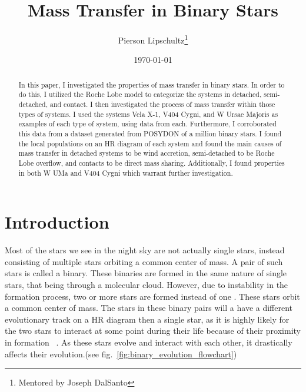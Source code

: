 \documentclass[12pt, a4paper]{article}
\title{Mass Transfer in Binary Stars}
\author{Pierson Lipschultz\thanks{Mentored by Joseph DalSanto}}
\date{\today}
\begin{document}
\maketitle
\begin{abstract}
    \normalsize
    In this paper, I investigated the properties of mass transfer in binary stars. In order to do this, I utilized the Roche Lobe model to categorize the systems in detached, semi-detached, and contact. I then investigated the process of mass transfer within those types of systems. I used the systems Vela X-1, V404 Cygni, and W Ursae Majoris as examples of each type of system, using data from each. Furthermore, I corroborated this data from a dataset generated from POSYDON of a million binary stars. I found the local populations on an HR diagram of each system and found the main causes of mass transfer in detached systems to be wind accretion, semi-detached to be Roche Lobe overflow, and contacts to be direct mass sharing. Additionally, I found properties in both W UMa and V404 Cygni which warrant further investigation.

\end{abstract}

\section{\centering Introduction} %

    Most of the stars we see in the night sky are not actually single stars, instead consisting of multiple stars orbiting a common center of mass. A pair of such stars is called a binary. These binaries are formed in the same nature of single stars, that being through a molecular cloud. However, due to instability in the formation process, two or more stars are formed instead of one \parencite{Offner_2016}. These stars orbit a common center of mass. The stars in these binary pairs will a have a different evolutionary track on a HR diagram then a single star, as it is highly likely for the two stars to interact at some point during their life because of their proximity in formation ~\parencite{Fabry_2025}. As these stars evolve and interact with each other, it drastically affects their evolution.(see fig.~\ref{fig:binary_evolution_flowchart})
\end{document}
